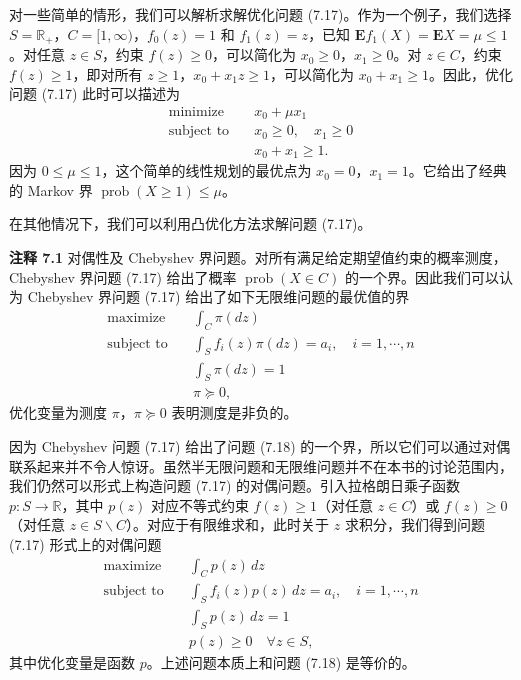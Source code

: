 \documentclass[UTF8, 12pt, fontset=fandol, oneside]{ctexart}
\begin{document}
对一些简单的情形，我们可以解析求解优化问题 (7.17)。作为一个例子，我们选择 $S=\mathbb{R}_+$，$C=[1,\infty)$，$f_0(z)=1$ 和 $f_1(z)=z$，已知 $\mathbf{E}f_1(X)=\mathbf{E}X=\mu\leq 1$。对任意 $z\in S$，约束 $f(z)\geq 0$，可以简化为 $x_0\geq 0$，$x_1\geq 0$。对 $z\in C$，约束 $f(z)\geq 1$，即对所有 $z\geq 1$，$x_0+x_1z\geq 1$，可以简化为 $x_0+x_1\geq 1$。因此，优化问题 (7.17) 此时可以描述为
\[
\begin{aligned}
\text{minimize}\quad & x_0+\mu x_1\\
\text{subject to}\quad & x_0\geq 0,\quad x_1\geq 0\\
& x_0+x_1\geq 1.
\end{aligned}
\]
因为 $0\leq \mu\leq 1$，这个简单的线性规划的最优点为 $x_0=0$，$x_1=1$。它给出了经典的 Markov 界 $\operatorname{prob}(X\geq 1)\leq\mu$。

在其他情况下，我们可以利用凸优化方法求解问题 (7.17)。

\noindent\textbf{注释 7.1}\quad
对偶性及 Chebyshev 界问题。对所有满足给定期望值约束的概率测度，Chebyshev 界问题 (7.17) 给出了概率 $\operatorname{prob}(X\in C)$ 的一个界。因此我们可以认为 Chebyshev 界问题 (7.17) 给出了如下无限维问题的最优值的界
\begin{equation}
\begin{aligned}
\text{maximize}\quad & \int_C \pi(dz)\\
\text{subject to}\quad & \int_S f_i(z)\pi(dz)=a_i,\quad i=1,\cdots,n\\
& \int_S \pi(dz)=1\\
& \pi\succeq 0,
\end{aligned}
\tag{7.18}
\end{equation}
优化变量为测度 $\pi$，$\pi\succeq 0$ 表明测度是非负的。

因为 Chebyshev 问题 (7.17) 给出了问题 (7.18) 的一个界，所以它们可以通过对偶联系起来并不令人惊讶。虽然半无限问题和无限维问题并不在本书的讨论范围内，我们仍然可以形式上构造问题 (7.17) 的对偶问题。引入拉格朗日乘子函数 $p:S\to\mathbb{R}$，其中 $p(z)$ 对应不等式约束 $f(z)\geq 1$（对任意 $z\in C$）或 $f(z)\geq 0$（对任意 $z\in S\backslash C$）。对应于有限维求和，此时关于 $z$ 求积分，我们得到问题 (7.17) 形式上的对偶问题
\[
\begin{aligned}
\text{maximize}\quad & \int_C p(z)\,dz\\
\text{subject to}\quad & \int_S f_i(z)p(z)\,dz=a_i,\quad i=1,\cdots,n\\
& \int_S p(z)\,dz=1\\
& p(z)\geq 0\quad \forall z\in S,
\end{aligned}
\]
其中优化变量是函数 $p$。上述问题本质上和问题 (7.18) 是等价的。
\end{document}
